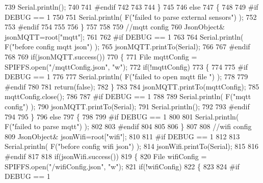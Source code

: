 \begin{DoxyCode}
739         Serial.println();
740 
741 \textcolor{preprocessor}{#endif }
742 
743 
744     \}
745 
746     \textcolor{keywordflow}{else}
747     \{   
748 
749 \textcolor{preprocessor}{    #if DEBUG == 1}
750         
751         Serial.println( F(\textcolor{stringliteral}{"failed to parse external sensors"}) );
752 
753 \textcolor{preprocessor}{    #endif}
754 
755 
756     \}
757 
758     
759     \textcolor{comment}{//mqtt config}
760         JsonObject& jsonMQTT=root[\textcolor{stringliteral}{"mqtt"}];
761     
762 \textcolor{preprocessor}{#if DEBUG == 1 }
763 
764     Serial.println( F(\textcolor{stringliteral}{"before config mqtt json"}) );
765     jsonMQTT.printTo(Serial);
766 
767 \textcolor{preprocessor}{#endif}
768 
769     \textcolor{keywordflow}{if}(jsonMQTT.success())
770     \{
771         File mqttConfig = SPIFFS.open(\textcolor{stringliteral}{"/mqttConfig.json"}, \textcolor{stringliteral}{"w"}); 
772         \textcolor{keywordflow}{if}(!mqttConfig)
773         \{
774         
775 \textcolor{preprocessor}{        #if DEBUG == 1 }
776 
777             Serial.println( F(\textcolor{stringliteral}{"failed to open mqtt file "}) );
778         
779 \textcolor{preprocessor}{        #endif}
780         
781             \textcolor{keywordflow}{return}(\textcolor{keyword}{false});
782         \}
783             
784         jsonMQTT.printTo(mqttConfig);
785         mqttConfig.close();
786 
787 \textcolor{preprocessor}{#if DEBUG == 1 }
788 
789         Serial.println( F(\textcolor{stringliteral}{"mqtt config"}) );
790         jsonMQTT.printTo(Serial);
791         Serial.println();
792 
793 \textcolor{preprocessor}{#endif}
794 
795     \}
796     \textcolor{keywordflow}{else}
797     \{
798 
799 \textcolor{preprocessor}{    #if DEBUG == 1 }
800 
801         Serial.println( F(\textcolor{stringliteral}{"failed to parse mqtt"}) );
802     
803 \textcolor{preprocessor}{    #endif}
804 
805     
806     \}   
807 
808     \textcolor{comment}{//wifi config}
809         JsonObject& jsonWifi=root[\textcolor{stringliteral}{"wifi"}];
810     
811 \textcolor{preprocessor}{#if DEBUG == 1 }
812 
813     Serial.println( F(\textcolor{stringliteral}{"before config wifi json"}) );
814     jsonWifi.printTo(Serial);
815 
816 \textcolor{preprocessor}{#endif}
817 
818     \textcolor{keywordflow}{if}(jsonWifi.success())
819     \{
820         File wifiConfig = SPIFFS.open(\textcolor{stringliteral}{"/wifiConfig.json"}, \textcolor{stringliteral}{"w"}); 
821         \textcolor{keywordflow}{if}(!wifiConfig)
822         \{
823         
824 \textcolor{preprocessor}{        #if DEBUG == 1 }

\end{DoxyCode}
